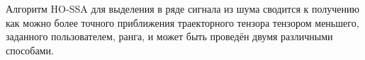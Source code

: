 \documentclass[specialist,
    substylefile = spbu_report.rtx,
    subf,href,colorlinks=true, 12pt]{disser}
\theoremstyle{plain}
\theoremstyle{definition}
\theoremstyle{remark}
\begin{document}

    Алгоритм HO-SSA для выделения в ряде сигнала из шума сводится к получению
    как можно более точного приближения траекторного тензора тензором меньшего, заданного пользователем, ранга, и
    может быть проведён двумя различными способами.
\end{document}
